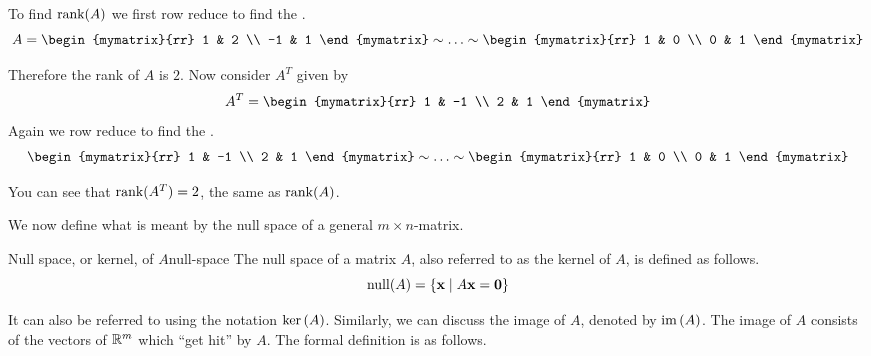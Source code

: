 \begin{solution}
  To find $\mbox{\rm rank}(A)$ we first row reduce to find the {\rref}.
  \begin{equation*}
    A =
    \begin{mymatrix}{rr}
      1 & 2 \\
      -1 & 1
    \end{mymatrix}
    \sim\ldots\sim
    \begin{mymatrix}{rr}
      1 & 0 \\
      0 & 1
    \end{mymatrix}
  \end{equation*}

  Therefore the rank of $A$ is $2$. Now consider $A^T$ given by
  \begin{equation*}
    A^T = \begin{mymatrix}{rr}
      1 & -1 \\
      2 & 1
    \end{mymatrix}
  \end{equation*}
  Again we row reduce to find the {\rref}.
  \begin{equation*}
    \begin{mymatrix}{rr}
      1 & -1 \\
      2 & 1
    \end{mymatrix}
    \sim\ldots\sim
    \begin{mymatrix}{rr}
      1 & 0 \\
      0 & 1
    \end{mymatrix}
  \end{equation*}

  You can see that $\mbox{\rm rank}(A^T) = 2$, the same as $\mbox{\rm rank}(A)$.
\end{solution}

We now define what is meant by the null space of a general
$m\times n$-matrix.

\begin{definition}{Null space, or kernel, of $A$}{null-space}
  The null space of a matrix $A$, also referred to as the kernel of
  $A$, is defined as follows.%
  \begin{equation*}
    \nullspace(A) =\set{\vect{x} \mid A \vect{x} =\vect{0}}
  \end{equation*}
\end{definition}

It can also be referred to using the notation $\ker \left( A\right)$.
Similarly, we can discuss the image of $A$, denoted by
$\mbox{\rm im}\left(A\right)$. The image of $A$ consists of the vectors of
$\mathbb{R}^{m}$ which ``get hit'' by $A$.  The formal definition is as
follows.

